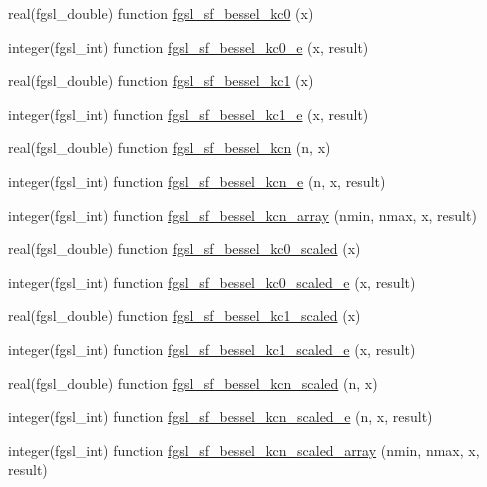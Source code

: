 \begin{DoxyCompactItemize}
real(fgsl\-\_\-double) function \hyperlink{specfunc_8finc_ac1738fb58677153aebb95154e0cb15fc}{fgsl\-\_\-sf\-\_\-bessel\-\_\-kc0} (x)
\item 
integer(fgsl\-\_\-int) function \hyperlink{specfunc_8finc_a4c3f1b48377b63e306013e0d3ed2fc47}{fgsl\-\_\-sf\-\_\-bessel\-\_\-kc0\-\_\-e} (x, result)
\item 
real(fgsl\-\_\-double) function \hyperlink{specfunc_8finc_a53ef70e6a6af47bfcdca7e3b5166213a}{fgsl\-\_\-sf\-\_\-bessel\-\_\-kc1} (x)
\item 
integer(fgsl\-\_\-int) function \hyperlink{specfunc_8finc_a188436151ab0e62e67c63c3f7a4dbc43}{fgsl\-\_\-sf\-\_\-bessel\-\_\-kc1\-\_\-e} (x, result)
\item 
real(fgsl\-\_\-double) function \hyperlink{specfunc_8finc_a43affe20564cff1ca8ebf59e536a4a51}{fgsl\-\_\-sf\-\_\-bessel\-\_\-kcn} (n, x)
\item 
integer(fgsl\-\_\-int) function \hyperlink{specfunc_8finc_a51ae1fce2df99aac942fe51242f0460b}{fgsl\-\_\-sf\-\_\-bessel\-\_\-kcn\-\_\-e} (n, x, result)
\item 
integer(fgsl\-\_\-int) function \hyperlink{specfunc_8finc_a7285353c97655105247f0d232b65a5ac}{fgsl\-\_\-sf\-\_\-bessel\-\_\-kcn\-\_\-array} (nmin, nmax, x, result)
\item 
real(fgsl\-\_\-double) function \hyperlink{specfunc_8finc_ad7c1b7c76d6881306f5aa9f0d4a1c498}{fgsl\-\_\-sf\-\_\-bessel\-\_\-kc0\-\_\-scaled} (x)
\item 
integer(fgsl\-\_\-int) function \hyperlink{specfunc_8finc_a7a0524a18062458bed82c133810231f5}{fgsl\-\_\-sf\-\_\-bessel\-\_\-kc0\-\_\-scaled\-\_\-e} (x, result)
\item 
real(fgsl\-\_\-double) function \hyperlink{specfunc_8finc_a1fa7add25cfe89073f4640118a6a3a0d}{fgsl\-\_\-sf\-\_\-bessel\-\_\-kc1\-\_\-scaled} (x)
\item 
integer(fgsl\-\_\-int) function \hyperlink{specfunc_8finc_a6edc260c54c8a66b67d0df91d5b4056c}{fgsl\-\_\-sf\-\_\-bessel\-\_\-kc1\-\_\-scaled\-\_\-e} (x, result)
\item 
real(fgsl\-\_\-double) function \hyperlink{specfunc_8finc_ab65bd6ab8ef876d3c550390bf2206a00}{fgsl\-\_\-sf\-\_\-bessel\-\_\-kcn\-\_\-scaled} (n, x)
\item 
integer(fgsl\-\_\-int) function \hyperlink{specfunc_8finc_a797130c78ea5076eb86b51cd564334fa}{fgsl\-\_\-sf\-\_\-bessel\-\_\-kcn\-\_\-scaled\-\_\-e} (n, x, result)
\item 
integer(fgsl\-\_\-int) function \hyperlink{specfunc_8finc_a7a521e31cb6419d89eeb73ffc086a508}{fgsl\-\_\-sf\-\_\-bessel\-\_\-kcn\-\_\-scaled\-\_\-array} (nmin, nmax, x, result)

\end{DoxyCompactItemize}
